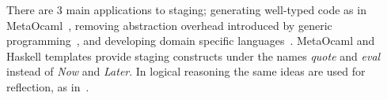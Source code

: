 There are $3$ main applications to staging; generating well-typed code as in \mbox{MetaOcaml}~\cite{taha1999multi}, removing abstraction overhead introduced by generic programming~\cite{yallop2016StagingGeneric, carette2011mspFunctorsMonads, carette2011generative}, and developing domain specific languages~\cite{sheard2000stagingDSL}. MetaOcaml and Haskell templates provide staging constructs under the names \emph{quote} and \emph{eval} instead of \emph{Now} and \emph{Later}. In logical reasoning the same ideas are used for reflection, as in~\cite{farmer2013quoteEval}.  



